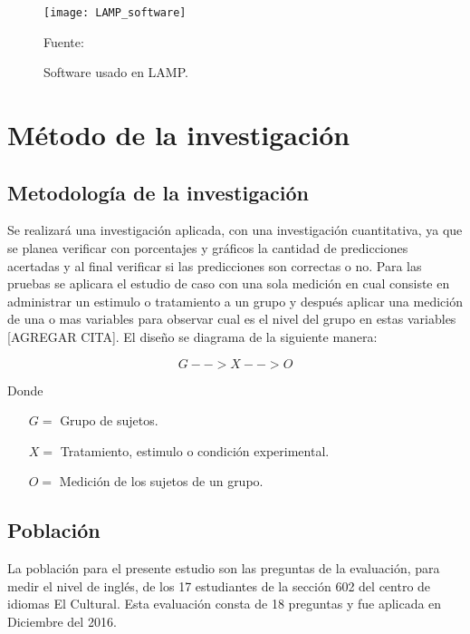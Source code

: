 \begin{figure}[ht]
	\begin{center}
		\texttt{[image: LAMP\_software]}
	\end{center}
	\begin{center}
		\vskip -0.5cm
		\caption{\small{Software usado en LAMP.}}
		{\small{Fuente: }}
	\end{center}
\end{figure}

\section{Método de la investigación}

\subsection{Metodología de la investigación}

Se realizará una investigación aplicada, con una investigación cuantitativa, ya que se planea verificar con porcentajes y gráficos la cantidad de predicciones acertadas y al final verificar si las predicciones son correctas o no.
\vskip 0.1cm 
Para las pruebas se aplicara el estudio de caso con una sola medición en cual consiste en administrar un estimulo o tratamiento a un grupo y después aplicar una medición de una o mas variables para observar cual es el nivel del grupo en estas variables [AGREGAR CITA]. El diseño se diagrama de la siguiente manera: 

\[ G  - - > X - - > O \]

\vskip 0.1cm 
Donde
\vskip 0.1cm 

\begin{itemize}
	\item [$G =$] Grupo de sujetos.
	\item [$X =$] Tratamiento, estimulo o condición experimental.
	\item [$O =$] Medición de los sujetos de un grupo.
\end{itemize}

\subsection{Población}

La población para el presente estudio son las preguntas de la evaluación, para medir el nivel de inglés, de los 17 estudiantes de la sección 602 del centro de idiomas El Cultural. Esta evaluación consta de 18 preguntas y fue aplicada en Diciembre del 2016.

